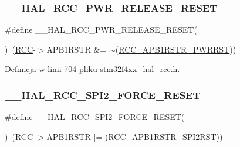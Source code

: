 \subsubsection{\texorpdfstring{\+\_\+\+\_\+\+H\+A\+L\+\_\+\+R\+C\+C\+\_\+\+P\+W\+R\+\_\+\+R\+E\+L\+E\+A\+S\+E\+\_\+\+R\+E\+S\+ET}{\_\_HAL\_RCC\_PWR\_RELEASE\_RESET}}
{\footnotesize\ttfamily \#define \+\_\+\+\_\+\+H\+A\+L\+\_\+\+R\+C\+C\+\_\+\+P\+W\+R\+\_\+\+R\+E\+L\+E\+A\+S\+E\+\_\+\+R\+E\+S\+ET(\begin{DoxyParamCaption}{ }\end{DoxyParamCaption})~(\hyperlink{group___peripheral__declaration_ga74944438a086975793d26ae48d5882d4}{R\+CC}-\/$>$A\+P\+B1\+R\+S\+TR \&= $\sim$(\hyperlink{group___peripheral___registers___bits___definition_ga274d8cb48f0e89831efabea66d64af2a}{R\+C\+C\+\_\+\+A\+P\+B1\+R\+S\+T\+R\+\_\+\+P\+W\+R\+R\+ST}))}



Definicja w linii 704 pliku stm32f4xx\+\_\+hal\+\_\+rcc.\+h.

\mbox{\label{group___r_c_c___a_p_b1___force___release___reset_ga869e4f5c1132e3dfce084099cf454c51}} 
\subsubsection{\texorpdfstring{\+\_\+\+\_\+\+H\+A\+L\+\_\+\+R\+C\+C\+\_\+\+S\+P\+I2\+\_\+\+F\+O\+R\+C\+E\+\_\+\+R\+E\+S\+ET}{\_\_HAL\_RCC\_SPI2\_FORCE\_RESET}}
{\footnotesize\ttfamily \#define \+\_\+\+\_\+\+H\+A\+L\+\_\+\+R\+C\+C\+\_\+\+S\+P\+I2\+\_\+\+F\+O\+R\+C\+E\+\_\+\+R\+E\+S\+ET(\begin{DoxyParamCaption}{ }\end{DoxyParamCaption})~(\hyperlink{group___peripheral__declaration_ga74944438a086975793d26ae48d5882d4}{R\+CC}-\/$>$A\+P\+B1\+R\+S\+TR $\vert$= (\hyperlink{group___peripheral___registers___bits___definition_ga0a6289a35547cf0d5300706f9baa18ea}{R\+C\+C\+\_\+\+A\+P\+B1\+R\+S\+T\+R\+\_\+\+S\+P\+I2\+R\+ST}))}



